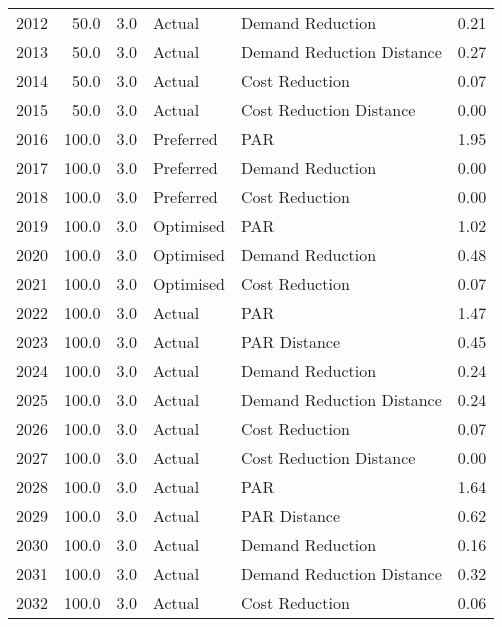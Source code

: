 \begin{longtable}{lrrllr}
2012 &         50.0 &     3.0 &         Actual &           Demand Reduction &   0.21 \\
2013 &         50.0 &     3.0 &         Actual &  Demand Reduction Distance &   0.27 \\
2014 &         50.0 &     3.0 &         Actual &             Cost Reduction &   0.07 \\
2015 &         50.0 &     3.0 &         Actual &    Cost Reduction Distance &   0.00 \\
2016 &        100.0 &     3.0 &      Preferred &                        PAR &   1.95 \\
2017 &        100.0 &     3.0 &      Preferred &           Demand Reduction &   0.00 \\
2018 &        100.0 &     3.0 &      Preferred &             Cost Reduction &   0.00 \\
2019 &        100.0 &     3.0 &      Optimised &                        PAR &   1.02 \\
2020 &        100.0 &     3.0 &      Optimised &           Demand Reduction &   0.48 \\
2021 &        100.0 &     3.0 &      Optimised &             Cost Reduction &   0.07 \\
2022 &        100.0 &     3.0 &         Actual &                        PAR &   1.47 \\
2023 &        100.0 &     3.0 &         Actual &               PAR Distance &   0.45 \\
2024 &        100.0 &     3.0 &         Actual &           Demand Reduction &   0.24 \\
2025 &        100.0 &     3.0 &         Actual &  Demand Reduction Distance &   0.24 \\
2026 &        100.0 &     3.0 &         Actual &             Cost Reduction &   0.07 \\
2027 &        100.0 &     3.0 &         Actual &    Cost Reduction Distance &   0.00 \\
2028 &        100.0 &     3.0 &         Actual &                        PAR &   1.64 \\
2029 &        100.0 &     3.0 &         Actual &               PAR Distance &   0.62 \\
2030 &        100.0 &     3.0 &         Actual &           Demand Reduction &   0.16 \\
2031 &        100.0 &     3.0 &         Actual &  Demand Reduction Distance &   0.32 \\
2032 &        100.0 &     3.0 &         Actual &             Cost Reduction &   0.06 \\

\end{longtable}
